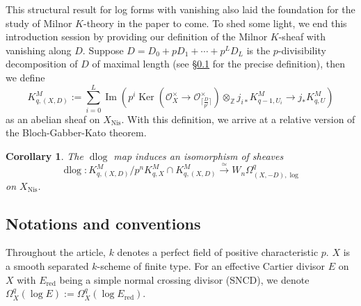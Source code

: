 \documentclass[11pt]{amsart}
\newcommand{\ra}{\rightarrow}
\newcommand{\Z}{\mathbb{Z}}
\newcommand{\cO}{\mathcal{O}}
\newcommand{\Ker}{\operatorname{Ker}}
\renewcommand{\Im}{\operatorname{Im}}
\newcommand{\xra}{\xrightarrow}
\newcommand{\red}{{\operatorname{red}}}
\newcommand{\dlog}{\operatorname{dlog}}
\newcommand{\Nis}{{\operatorname{Nis}}}
\theoremstyle{plain}
\newtheorem{cor}[prop]{Corollary}
\theoremstyle{definition}
\numberwithin{equation}{prop}
\begin{document}
This structural result for log forms with vanishing also laid the foundation for the study of Milnor $K$-theory in the paper to come.
To shed some light, we end this introduction session by providing our definition of the Milnor $K$-sheaf with vanishing along $D$. Suppose $D=D_0+pD_1+\cdots+ p^LD_L$ is the $p$-divisibility decomposition of $D$ of maximal length (see \S\ref{para:div-not} for the precise definition), then we define
$$K^M_{q,(X,D)}:=
\sum_{i=0}^{L} 
\Im\left(
 p^i  \Ker(\cO_X^\times\ra \cO_{ \lceil\frac{D}{p^i}\rceil}^ \times)
\otimes_\Z 
j_{i*} K^M_{q-1,U_i}
\ra 
j_*K^M_{q,U}
\right)$$
as an abelian sheaf on $X_\Nis$.
With this definition, we arrive at a relative version of the Bloch-Gabber-Kato theorem.
\begin{cor}
The $\dlog$ map induces an isomorphism of sheaves
$$\dlog: K^M_{q,(X,D)}/p^n K^M_{q,X}\cap  K^M_{q,(X,D)}
\xra{\simeq}
W_n\Omega^q_{(X,-D),\log}$$
on $X_\Nis$.
\end{cor}











\subsection{Notations and conventions}
\label{para:div-not}
Throughout the article, $k$ denotes a perfect field of positive characteristic $p$. 
$X$ is a smooth separated $k$-scheme of finite type.
For an effective Cartier divisor $E$ on $X$ with $E_\red$ being a simple normal crossing divisor (SNCD), we denote
$\Omega^q_X(\log E):=\Omega^q_{X}(\log E_\red).$
\end{document}
